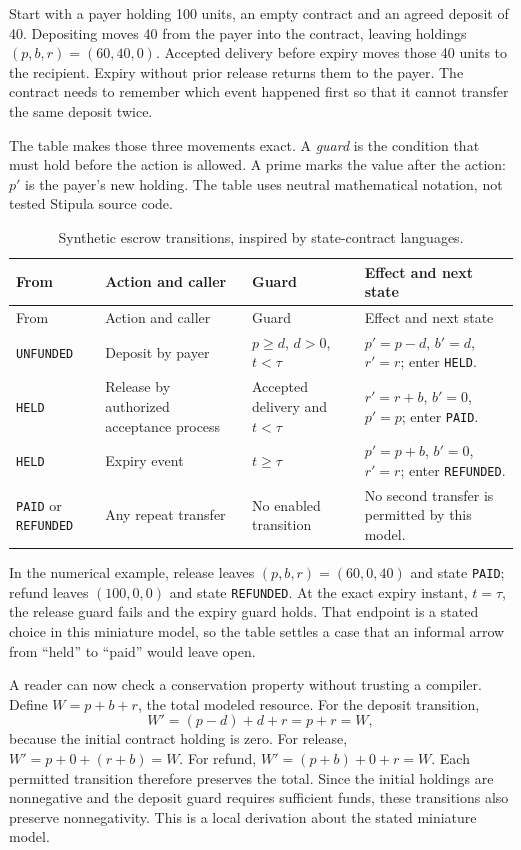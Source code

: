 \documentclass[12pt,a4paper,oneside,openany]{book}
\begin{document}
Start with a payer holding 100 units, an empty contract and an agreed deposit of
40. Depositing moves 40 from the payer into the contract, leaving holdings
$(p,b,r)=(60,40,0)$. Accepted delivery before expiry moves those 40 units to the
recipient. Expiry without prior release returns them to the payer. The contract
needs to remember which event happened first so that it cannot transfer the
same deposit twice.

The table makes those three movements exact. A \emph{guard} is the condition
that must hold before the action is allowed. A prime marks the value after the
action: $p'$ is the payer's new holding. The table uses neutral mathematical
notation, not tested Stipula source code.

\begin{longtable}{@{}P{24mm}P{33mm}P{42mm}P{48mm}@{}}
\caption{Synthetic escrow transitions, inspired by state-contract languages.}\\
\toprule
From & Action and caller & Guard & Effect and next state\\\midrule\endfirsthead
\toprule From & Action and caller & Guard & Effect and next state\\\midrule\endhead
\texttt{UNFUNDED} & Deposit by payer & $p\geq d$, $d>0$, $t<\tau$ & $p'=p-d$, $b'=d$, $r'=r$; enter \texttt{HELD}.\\
\texttt{HELD} & Release by authorized acceptance process & Accepted delivery and $t<\tau$ & $r'=r+b$, $b'=0$, $p'=p$; enter \texttt{PAID}.\\
\texttt{HELD} & Expiry event & $t\geq\tau$ & $p'=p+b$, $b'=0$, $r'=r$; enter \texttt{REFUNDED}.\\
\texttt{PAID} or \texttt{REFUNDED} & Any repeat transfer & No enabled transition & No second transfer is permitted by this model.\\
\bottomrule
\end{longtable}

In the numerical example, release leaves $(p,b,r)=(60,0,40)$ and state
\texttt{PAID}; refund leaves $(100,0,0)$ and state \texttt{REFUNDED}. At the exact
expiry instant, $t=\tau$, the release guard fails and the expiry guard holds.
That endpoint is a stated choice in this miniature model, so the table settles
a case that an informal arrow from ``held'' to ``paid'' would leave open.

A reader can now check a conservation property without trusting a compiler. Define
$W=p+b+r$, the total modeled resource. For the deposit transition,
\begin{equation}
 W'=(p-d)+d+r=p+r=W,
 \label{eq:escrow-deposit}
\end{equation}
because the initial contract holding is zero. For release,
$W'=p+0+(r+b)=W$. For refund, $W'=(p+b)+0+r=W$. Each permitted transition therefore
preserves the total. Since the initial holdings are nonnegative and the deposit
guard requires sufficient funds, these transitions also preserve nonnegativity.
This is a local derivation about the stated miniature model.
\end{document}
